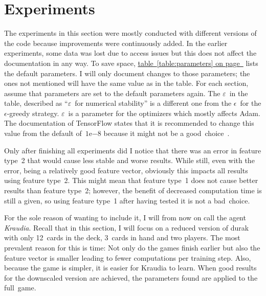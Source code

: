 \documentclass[a4paper,titlepage]{article}
\newcommand{\expn}[2]{{#1}\mathrm{e}{#2}}
\begin{document}
\newpage

\section{Experiments}
\label{sec:experiments}

The experiments in this section were mostly conducted with different versions of the code because improvements were continuously added. In the earlier experiments, some data was lost due to access issues but this does not affect the documentation in any way.
To save space, \hyperref[table:parameters]{table~\ref*{table:parameters} on page~\pageref*{table:parameters}} lists the default parameters.
I will only document changes to those parameters; the ones not mentioned will have the same value as in the table. For each section, assume that parameters are set to the default parameters again. The $\varepsilon$~in the table, described as ``$\varepsilon$~for numerical stability'' is a different one from the $\epsilon$~for the $\epsilon$-greedy strategy. $\varepsilon$~is a parameter for the optimizers which mostly affects Adam. The documentation of TensorFlow states that it is recommended to change this value from the default of~$\expn{1}{-8}$ because it might not be a good~choice~\cite{tfadam}.

Only after finishing all experiments did I notice that there was an error in feature type~2 that would cause less stable and worse results. While still, even with the error, being a relatively good feature vector, obviously this impacts all results using feature type~2. This might mean that feature type~1 does not cause better results than feature type~2; however, the benefit of decreased computation time is still a given, so using feature type~1 after having tested it is not a bad~choice.

For the sole reason of wanting to include it, I will from now on call the agent \emph{Kraudia}.
Recall that in this section, I will focus on a reduced version of durak with only 12~cards in the deck, 3~cards in hand and two players. The most prevalent reason for this is time: Not only do the games finish earlier but also the feature vector is smaller leading to fewer computations per training step.
Also, because the game is simpler, it is easier for Kraudia to learn. When good results for the downscaled version are achieved, the parameters found are applied to the full~game.
\end{document}
